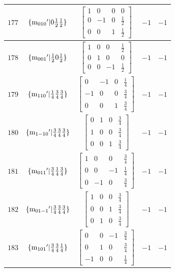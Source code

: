 \documentclass[fleqn,8pt]{jsarticle}
\begin{document}
\begin{longtable}{ccccc}
$ 177 $ & $ \{{\rm m}_{010}{}'|0 \frac{1}{2} \frac{1}{2}\} $ & $ \begin{bmatrix} 1 & 0 & 0 & 0 \\ 0 & -1 & 0 & \frac{1}{2} \\ 0 & 0 & 1 & \frac{1}{2} \end{bmatrix} $ & $ -1 $ & $ -1 $ \\ \hline
$ 178 $ & $ \{{\rm m}_{001}{}'|\frac{1}{2} 0 \frac{1}{2}\} $ & $ \begin{bmatrix} 1 & 0 & 0 & \frac{1}{2} \\ 0 & 1 & 0 & 0 \\ 0 & 0 & -1 & \frac{1}{2} \end{bmatrix} $ & $ -1 $ & $ -1 $ \\ \hline
$ 179 $ & $ \{{\rm m}_{110}{}'|\frac{1}{4} \frac{3}{4} \frac{3}{4}\} $ & $ \begin{bmatrix} 0 & -1 & 0 & \frac{1}{4} \\ -1 & 0 & 0 & \frac{3}{4} \\ 0 & 0 & 1 & \frac{3}{4} \end{bmatrix} $ & $ -1 $ & $ -1 $ \\ \hline
$ 180 $ & $ \{{\rm m}_{1-10}{}'|\frac{3}{4} \frac{3}{4} \frac{3}{4}\} $ & $ \begin{bmatrix} 0 & 1 & 0 & \frac{3}{4} \\ 1 & 0 & 0 & \frac{3}{4} \\ 0 & 0 & 1 & \frac{3}{4} \end{bmatrix} $ & $ -1 $ & $ -1 $ \\ \hline
$ 181 $ & $ \{{\rm m}_{011}{}'|\frac{3}{4} \frac{1}{4} \frac{3}{4}\} $ & $ \begin{bmatrix} 1 & 0 & 0 & \frac{3}{4} \\ 0 & 0 & -1 & \frac{1}{4} \\ 0 & -1 & 0 & \frac{3}{4} \end{bmatrix} $ & $ -1 $ & $ -1 $ \\ \hline
$ 182 $ & $ \{{\rm m}_{01-1}{}'|\frac{3}{4} \frac{3}{4} \frac{3}{4}\} $ & $ \begin{bmatrix} 1 & 0 & 0 & \frac{3}{4} \\ 0 & 0 & 1 & \frac{3}{4} \\ 0 & 1 & 0 & \frac{3}{4} \end{bmatrix} $ & $ -1 $ & $ -1 $ \\ \hline
$ 183 $ & $ \{{\rm m}_{101}{}'|\frac{3}{4} \frac{3}{4} \frac{1}{4}\} $ & $ \begin{bmatrix} 0 & 0 & -1 & \frac{3}{4} \\ 0 & 1 & 0 & \frac{3}{4} \\ -1 & 0 & 0 & \frac{1}{4} \end{bmatrix} $ & $ -1 $ & $ -1 $ \\ \hline

\end{longtable}
\end{document}
